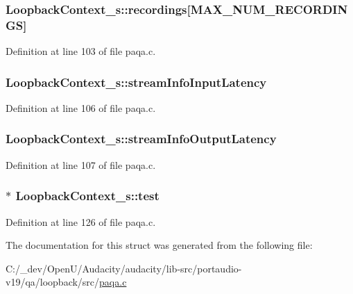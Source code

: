\subsubsection[{\texorpdfstring{recordings}{recordings}}]{ Loopback\+Context\+\_\+s\+::recordings\mbox{[}{\bf M\+A\+X\+\_\+\+N\+U\+M\+\_\+\+R\+E\+C\+O\+R\+D\+I\+N\+GS}\mbox{]}}\hypertarget{struct_loopback_context__s_ad1c82c2c4394aed28cbc6b2c4a5b66dc}{}\label{struct_loopback_context__s_ad1c82c2c4394aed28cbc6b2c4a5b66dc}


Definition at line 103 of file paqa.\+c.

\subsubsection[{\texorpdfstring{stream\+Info\+Input\+Latency}{streamInfoInputLatency}}]{ Loopback\+Context\+\_\+s\+::stream\+Info\+Input\+Latency}\hypertarget{struct_loopback_context__s_ac455ac012535f985c53365feb0f91859}{}\label{struct_loopback_context__s_ac455ac012535f985c53365feb0f91859}


Definition at line 106 of file paqa.\+c.

\subsubsection[{\texorpdfstring{stream\+Info\+Output\+Latency}{streamInfoOutputLatency}}]{ Loopback\+Context\+\_\+s\+::stream\+Info\+Output\+Latency}\hypertarget{struct_loopback_context__s_a043f29ff78c8aad99aaf609a45ebe1aa}{}\label{struct_loopback_context__s_a043f29ff78c8aad99aaf609a45ebe1aa}


Definition at line 107 of file paqa.\+c.

\subsubsection[{\texorpdfstring{test}{test}}]{$\ast$ Loopback\+Context\+\_\+s\+::test}\hypertarget{struct_loopback_context__s_af4a5c6b30136380162dfafcb9287020b}{}\label{struct_loopback_context__s_af4a5c6b30136380162dfafcb9287020b}


Definition at line 126 of file paqa.\+c.



The documentation for this struct was generated from the following file\+:\begin{DoxyCompactItemize}
\item 
C\+:/\+\_\+dev/\+Open\+U/\+Audacity/audacity/lib-\/src/portaudio-\/v19/qa/loopback/src/\hyperlink{paqa_8c}{paqa.\+c}\end{DoxyCompactItemize}
